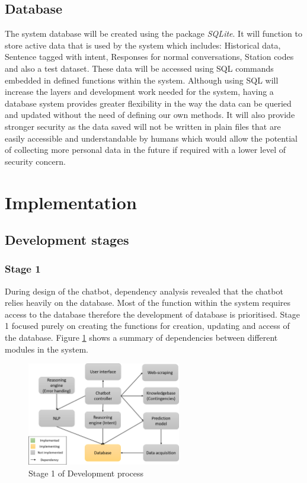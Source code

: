 \documentclass[11pt]{article}
\begin{document}
\subsection{Database}
The system database will be created using the package \textit{SQLite}. It will function to store active data that is used by the system which includes: Historical data, Sentence tagged with intent, Responses for normal conversations, Station codes and also a test dataset. These data will be accessed using SQL commands embedded in defined functions within the system. Although using SQL will increase the layers and development work needed for the system, having a database system provides greater flexibility in the way the data can be queried and updated without the need of defining our own methods. It will also provide stronger security as the data saved will not be written in plain files that are easily accessible and understandable by humans which would allow the potential of collecting more personal data in the future if required with a lower level of security concern.

\section{Implementation}
\subsection{Development stages} \label{Dev. stages}
\subsubsection{Stage 1}
During design of the chatbot, dependency analysis revealed that the chatbot relies heavily on the database. Most of the function within the system requires access to the database therefore the development of database is prioritised. Stage 1 focused purely on creating the functions for creation, updating and access of the database. Figure \ref{fig:Stage 1} shows a summary of dependencies between different modules in the system.
\begin{figure}[!htb]
	\centering
	\includegraphics[width=0.6\textwidth]{Stage_1}
	\caption{Stage 1 of Development process }\label{fig:Stage 1}
\end{figure}
\end{document}
